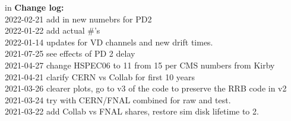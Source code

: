 \documentclass[12pt]{article}
\begin{document}
 in\pagebreak 
 {\bf Change log:}\\
2022-02-21 add in new numebrs for PD2\\2022-01-22 add actual #'s\\2022-01-14 updates for VD channels and new drift times.\\2021-07-25 see effects of PD 2 delay\\2021-04-27 change HSPEC06 to 11 from 15 per CMS numbers from Kirby\\2021-04-21 clarify CERN vs Collab for first 10 years\\2021-03-26 clearer plots, go to v3 of the code to preserve the RRB code in v2\\2021-03-24 try with CERN/FNAL combined for raw and test.\\2021-03-22 add Collab vs FNAL shares, restore sim disk lifetime to 2.\\
\end{document}
